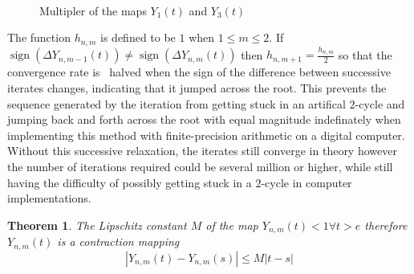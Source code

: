 \documentclass{article}
\newcommand{\tmop}[1]{\ensuremath{\operatorname{#1}}}
\newtheorem{theorem}{Theorem}
\begin{document}
\

\begin{figure}[h]
  \caption{Multipler of the maps $Y_1 (t)$ and $Y_3 (t)$}
\end{figure}

\begin{remark}
  The function $h_{n, m}$ is defined to be $1$ when $1 \leqslant m \leqslant
  2$. If $\tmop{sign} (\Delta Y^{}_{n, m - 1} (t)) \neq \tmop{sign} (\Delta
  Y^{}_{n, m} (t))$ then $h_{n, m + 1} = \frac{h_{n, m}}{2}$ so that the
  convergence rate is \ halved when the sign of the difference between
  successive iterates changes, indicating that it jumped across the root. This
  prevents the sequence generated by the iteration from getting stuck in an
  artifical $2$-cycle and jumping back and forth across the root with equal
  magnitude indefinately when implementing this method with finite-precision
  arithmetic on a digital computer. Without this successive relaxation, the
  iterates still converge in theory however the number of iterations required
  could be several million or higher, while still having the difficulty of
  possibly getting stuck in a $2$-cycle in computer implementations.
\end{remark}

\begin{theorem}
  \label{cm}The Lipschitz constant $M$ of the map $Y_{n, m} (t) < 1 \forall t
  > e$ therefore $Y_{n, m} (t)$ is a contraction mapping
  \begin{equation}
    | Y_{n, m} (t) - Y_{n, m} (s) | \leqslant M | t - s |
  \end{equation}
\end{theorem}
\end{document}
